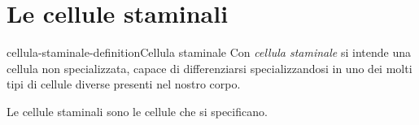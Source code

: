 \documentclass[preview]{standalone}
\begin{document}
\genpage

\section{Le cellule staminali}

\begin{snippetdefinition}{cellula-staminale-definition}{Cellula staminale}
    Con \textit{cellula staminale} si intende una cellula non specializzata,
    capace di differenziarsi specializzandosi in uno dei molti tipi di cellule
    diverse presenti nel nostro corpo.
\end{snippetdefinition}

\begin{plainhtml}
    Le cellule staminali sono le cellule che si specificano.
\end{plainhtml}
\end{document}
